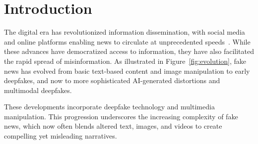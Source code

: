\documentclass[runningheads]{llncs}
\begin{document}
\begin{abstract}
The digital age has witnessed an unprecedented surge in fake news, a challenge further exacerbated by advanced Large Language Models (LLMs) capable of subtle content manipulation. This study systematically evaluates the robustness of fake news detection methods—spanning traditional machine learning and deep learning-based models—against LLM-generated texts using the WELFake dataset. Transformer-based models (e.g., DistilBERT) show near-perfect accuracy on original data but suffer up to a 33\% drop in F1-score on LLM-manipulated content, whereas traditional methods exhibit greater resilience. We further demonstrate that incorporating both original and manipulated texts during training improves detection robustness, albeit with increased computational costs. Our findings underscore the urgent need for adaptive detection strategies that balance high accuracy with robustness against sophisticated content manipulation. To ensure full reproducibility and support future research, our codebase, datasets, and trained models are openly available at \url{https://github.com/inflaton/fake-news}.

\end{abstract}

\section{Introduction}
\label{sec:introduction}

The digital era has revolutionized information dissemination, with social media and online platforms enabling news to circulate at unprecedented speeds~\cite{shang2021mining,wang2014anomaly}. While these advances have democratized access to information, they have also facilitated the rapid spread of misinformation. 
As illustrated in Figure~\ref{fig:evolution}, fake news has evolved from basic text-based content and image manipulation to early deepfakes, and now to more sophisticated AI-generated distortions and multimodal deepfakes. 

These developments incorporate deepfake technology and multimedia manipulation. This progression underscores the increasing complexity of fake news, which now often blends altered text, images, and videos to create compelling yet misleading narratives. 
\end{document}
